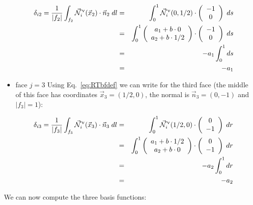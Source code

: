 \begin{itemize}
\begin{eqnarray}
\delta_{i2}=
\frac{1}{|f_2|} \int_{f_2} \vec{{\mathcal{N}}}^\upnu_i( \vec{x}_2) \cdot \vec{n}_2 \; dl
&=& 
 \int_{0}^1  \vec{{\mathcal{N}}}^\upnu_i( 0,1/2) \cdot 
\left(\begin{array}{c} -1 \\0 \end{array}\right) \; ds \nonumber\\
&=&  \int_{0}^1 
\left(\begin{array}{c} a_1 + b \cdot 0 \\ a_2 + b \cdot 1/2 \end{array}\right)
\cdot 
\left(\begin{array}{c} -1 \\ 0 \end{array}\right) \; ds \nonumber\\
&=& -   a_1 \int_0^1 ds \nonumber\\
&=& -   a_1 \label{eq:RT0tri2}
\end{eqnarray}


\item face $j=3$
Using Eq.~\eqref{eq:RTbfdef} we can write for the third face (the middle of this face has coordinates 
$\vec{x}_3=(1/2,0)$, the normal is $\vec{n}_3=(0,-1)$  and $|f_3|=1$):

\begin{eqnarray}
\delta_{i3}=
\frac{1}{|f_3|} \int_{f_3} \vec{{\mathcal{N}}}^\upnu_i( \vec{x}_3) \cdot \vec{n}_3 \; dl
&=& 
 \int_{0}^{1} \vec{{\mathcal{N}}}^\upnu_i( 1/2,0) \cdot \left(\begin{array}{c} 0 \\-1 \end{array}\right) \; dr \nonumber\\
&=&
 \int_{0}^{1} \left(\begin{array}{c} a_1+b\cdot 1/2 \\ a_2 + b \cdot 0 \end{array}\right) \cdot \left(\begin{array}{c} 0 \\ -1 \end{array}\right) \; dr \nonumber\\
&=& -  a_2 \int_{0}^{1}  dr \nonumber\\
&=& - a_2  \label{eq:RT0tri3}
\end{eqnarray}
\end{itemize}

We can now compute the three basis functions: 


